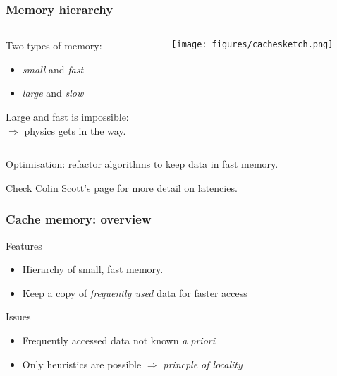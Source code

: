 \documentclass[dvipsnames,presentation,aspectratio=169,14pt]{beamer}
\begin{document}
\begin{frame}
  \frametitle{Memory hierarchy}
  \vskip -15pt

  \begin{columns}
    \begin{column}{0.45\textwidth}
      Two types of memory:\\[7pt]
      \begin{itemize}[itemsep=7pt]
      \item \emph{small} and \emph{fast}
      \item \emph{large} and \emph{slow}
      \end{itemize}
      \vskip 7pt

      Large and fast is impossible:\\[7pt]
      \hspace{11pt} $\Rightarrow$ physics gets in the way.
    \end{column}
    \begin{column}{0.45\textwidth}
      \begin{center}
        \texttt{[image: figures/cachesketch.png]}
      \end{center}
    \end{column}
  \end{columns}
  \vspace{\baselineskip}
  Optimisation: refactor algorithms to keep data in fast
  memory.

  {\footnotesize
    Check
    \href{https://colin-scott.github.io/personal_website/research/interactive_latency.html}{Colin
      Scott's page}
    for more detail on latencies.}
\end{frame}

\begin{frame}
  \frametitle{Cache memory: overview}

  \begin{exampleblock}{Features}
    \begin{itemize}[itemsep=6pt]
    \item Hierarchy of small, fast memory.
    \item Keep a copy of \emph{frequently used} data for faster access
    \end{itemize}
  \end{exampleblock}

  \pause

  \begin{challenge}{Issues}
    \begin{itemize}[itemsep=6pt]
    \item Frequently accessed data not known \emph{a priori}
    \item Only heuristics are possible $\Rightarrow$ \emph{princple of locality}
    \end{itemize}
  \end{challenge}

\end{frame}
\end{document}
